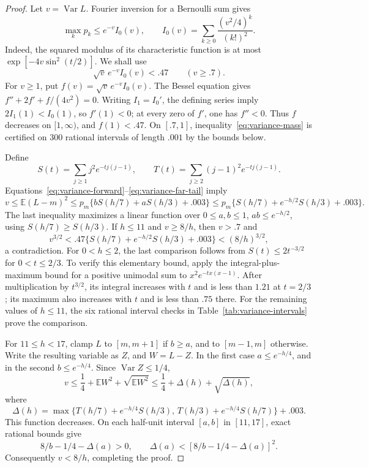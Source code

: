 \begin{proof}
Let $v=\operatorname{Var}L$. Fourier inversion for a Bernoulli sum gives
\[
 \max_k p_k\le e^{-v}I_0(v),\qquad
 I_0(v)=\sum_{k\ge0}\frac{(v^2/4)^k}{(k!)^2}.
\]
Indeed, the squared modulus of its characteristic function is at most
$\exp[-4v\sin^2(t/2)]$. We shall use
\begin{equation}\label{eq:variance-mass}
 \sqrt v\,e^{-v}I_0(v)<.47\qquad(v\ge.7).
\end{equation}
For $v\ge1$, put $f(v)=\sqrt v\,e^{-v}I_0(v)$. The Bessel equation gives
$f''+2f'+f/(4v^2)=0$. Writing $I_1=I_0'$, the defining series imply
$2I_1(1)<I_0(1)$, so $f'(1)<0$; at every zero of $f'$, one has
$f''<0$. Thus $f$ decreases on $[1,\infty)$, and $f(1)<.47$.
On $[.7,1]$, inequality~\eqref{eq:variance-mass} is certified on
300 rational intervals of length $.001$ by the bounds below.

Define
\[
 S(t)=\sum_{j\ge1}j^2e^{-tj(j-1)},\qquad
 T(t)=\sum_{j\ge2}(j-1)^2e^{-tj(j-1)}.
\]
Equations~\eqref{eq:variance-forward}--\eqref{eq:variance-far-tail}
imply
\[
 v\le\mathbb E(L-m)^2
 \le p_m\{bS(h/7)+aS(h/3)+.003\}
 \le p_m\{S(h/7)+e^{-h/2}S(h/3)+.003\}.
\]
The last inequality maximizes a linear function over
$0\le a,b\le1$, $ab\le e^{-h/2}$, using $S(h/7)\ge S(h/3)$.
If $h\le11$ and $v\ge8/h$, then $v>.7$ and
\[
 v^{3/2}<.47\{S(h/7)+e^{-h/2}S(h/3)+.003\}
          <(8/h)^{3/2},
\]
a contradiction. For $0<h\le2$, the last comparison follows from
$S(t)\le2t^{-3/2}$ for $0<t\le2/3$. To verify this elementary bound,
apply the integral-plus-maximum bound for a positive unimodal sum to
$x^2e^{-tx(x-1)}$. After multiplication by $t^{3/2}$, its integral
increases with $t$ and is less than $1.21$ at $t=2/3$; its maximum
also increases with $t$ and is less than $.75$ there. For the remaining
values of $h\le11$, the six rational interval checks in
Table~\ref{tab:variance-intervals} prove the comparison.

For $11\le h<17$, clamp $L$ to $[m,m+1]$ if $b\ge a$, and to
$[m-1,m]$ otherwise. Write the resulting variable as $Z$, and
$W=L-Z$. In the first case $a\le e^{-h/4}$, and in the second
$b\le e^{-h/4}$. Since $\operatorname{Var}Z\le1/4$,
\[
 v\le\frac14+\mathbb EW^2+\sqrt{\mathbb EW^2}
 \le\frac14+\Delta(h)+\sqrt{\Delta(h)},
\]
where
\[
 \Delta(h)=\max\{T(h/7)+e^{-h/4}S(h/3),\,
                    T(h/3)+e^{-h/4}S(h/7)\}+.003.
\]
This function decreases. On each half-unit interval $[a,b]$ in
$[11,17]$, exact rational bounds give
\[
 8/b-1/4-\Delta(a)>0,\qquad
 \Delta(a)<[8/b-1/4-\Delta(a)]^2.
\]
Consequently $v<8/h$, completing the proof.
\end{proof}

